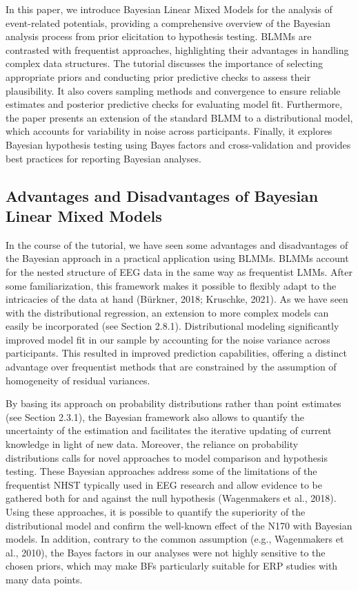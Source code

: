 \documentclass[
  doc,12pt,floatsintext]{apa7}
\begin{document}
In this paper, we introduce Bayesian Linear Mixed Models for the analysis of event-related potentials, providing a comprehensive overview of the Bayesian analysis process from prior elicitation to hypothesis testing. BLMMs are contrasted with frequentist approaches, highlighting their advantages in handling complex data structures. The tutorial discusses the importance of selecting appropriate priors and conducting prior predictive checks to assess their plausibility. It also covers sampling methods and convergence to ensure reliable estimates and posterior predictive checks for evaluating model fit. Furthermore, the paper presents an extension of the standard BLMM to a distributional model, which accounts for variability in noise across participants. Finally, it explores Bayesian hypothesis testing using Bayes factors and cross-validation and provides best practices for reporting Bayesian analyses.

\subsection{Advantages and Disadvantages of Bayesian Linear Mixed Models}\label{advantages-and-disadvantages-of-bayesian-linear-mixed-models}

In the course of the tutorial, we have seen some advantages and disadvantages of the Bayesian approach in a practical application using BLMMs. BLMMs account for the nested structure of EEG data in the same way as frequentist LMMs. After some familiarization, this framework makes it possible to flexibly adapt to the intricacies of the data at hand (Bürkner, 2018; Kruschke, 2021). As we have seen with the distributional regression, an extension to more complex models can easily be incorporated (see Section 2.8.1). Distributional modeling significantly improved model fit in our sample by accounting for the noise variance across participants. This resulted in improved prediction capabilities, offering a distinct advantage over frequentist methods that are constrained by the assumption of homogeneity of residual variances.

By basing its approach on probability distributions rather than point estimates (see Section 2.3.1), the Bayesian framework also allows to quantify the uncertainty of the estimation and facilitates the iterative updating of current knowledge in light of new data. Moreover, the reliance on probability distributions calls for novel approaches to model comparison and hypothesis testing. These Bayesian approaches address some of the limitations of the frequentist NHST typically used in EEG research and allow evidence to be gathered both for and against the null hypothesis (Wagenmakers et al., 2018). Using these approaches, it is possible to quantify the superiority of the distributional model and confirm the well-known effect of the N170 with Bayesian models. In addition, contrary to the common assumption (e.g., Wagenmakers et al., 2010), the Bayes factors in our analyses were not highly sensitive to the chosen priors, which may make BFs particularly suitable for ERP studies with many data points.
\end{document}
